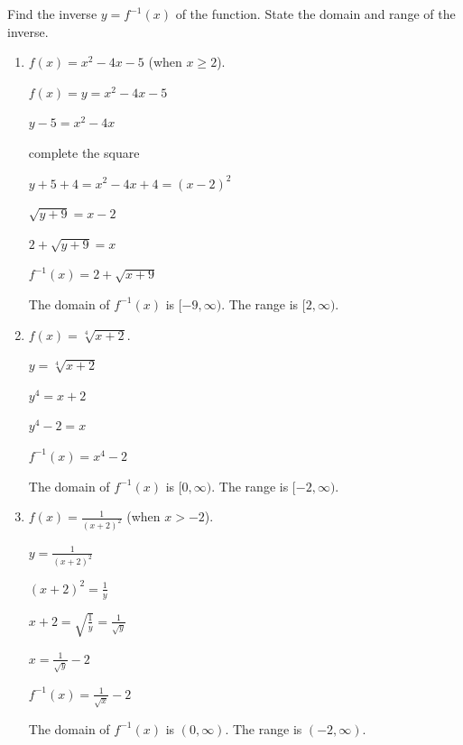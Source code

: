 \documentclass[nooutcomes]{ximera}
\begin{document}
\begin{problem}			
				
Find the inverse $y=f^{-1}(x)$ of the function.  State the domain and range of the inverse.
	
			\begin{enumerate}
			\item  $f(x)=x^2-4x-5$ (when $x\geq2$).
			
			 \begin{freeResponse}			 
			 $f(x)= y =x^2-4x-5 $ 
			
			$y-5=x^2-4x $
			
			complete the square
			
			$y+5+4=x^2-4x+4 = (x-2)^2$
			
			$ \sqrt{y+9}=x-2$
			
			$2+\sqrt{y+9}=x$
			
			$f^{-1}(x) = 2 + \sqrt{x + 9}$
			
			The domain of $f^{-1}(x)$ is $[-9,\infty )$.  The range is $[2,\infty )$.
			 \end{freeResponse}
			 
			\item  $f(x)=\sqrt[4]{x+2}$.
			
			 \begin{freeResponse}			 
			 $y=\sqrt[4]{x+2}$
			
			$y^4 = x + 2$
			
			$y^4 - 2 = x$
			
			$f^{-1}(x) = x^4 - 2$
			
			The domain of $f^{-1}(x)$ is $[0, \infty )$.  The range is $[-2, \infty )$.  
			 \end{freeResponse}
			 
			\item  $f(x)=\frac{1}{(x+2)^2}$  (when $x>-2$).
			
			 \begin{freeResponse}			 
			 $y = \frac{1}{(x+2)^2}$
			
			$(x+2)^2 = \frac{1}{y}$
			
			$ x+2 = \sqrt{\frac{1}{y}} = \frac{1}{\sqrt{y}}$	
			
			$x = \frac{1}{\sqrt{y}} - 2 $
			
			$f^{-1}(x) = \frac{1}{\sqrt{x}} - 2$
			
			The domain of $f^{-1}(x)$ is $(0, \infty)$.  The range is $(-2, \infty )$. 
			 \end{freeResponse}
			 
			\end{enumerate}
			
\end{problem}
	
\end{document}
